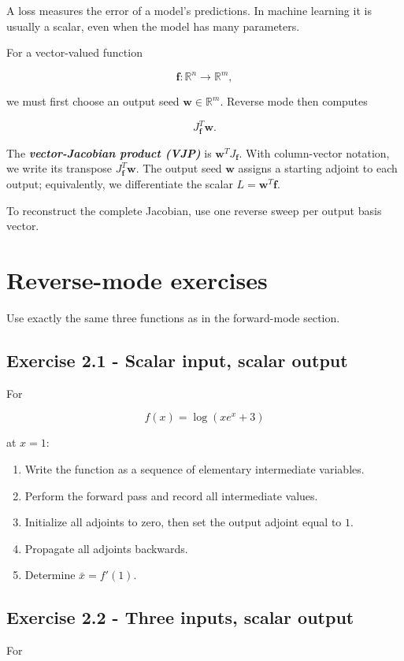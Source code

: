 \documentclass{course_sheet}
\begin{document}
A loss measures the error of a model's predictions. In machine learning it is usually a scalar, even when the model has many parameters.

For a vector-valued function

\[
\mathbf f:\mathbb R^n\to\mathbb R^m,
\]

we must first choose an output seed $\mathbf w\in\mathbb R^m$. Reverse mode then computes

\[
{
J_{\mathbf f}^T\mathbf w
}.
\]

The \textbf{\textit{vector-Jacobian product (VJP)}} is $\mathbf w^TJ_{\mathbf f}$. With column-vector notation, we write its transpose $J_{\mathbf f}^T\mathbf w$. The output seed $\mathbf w$ assigns a starting adjoint to each output; equivalently, we differentiate the scalar $L=\mathbf w^T\mathbf f$.

To reconstruct the complete Jacobian, use one reverse sweep per output basis vector.

\section*{Reverse-mode exercises}
Use exactly the same three functions as in the forward-mode section.

\subsection*{Exercise 2.1 - Scalar input, scalar output}
For

\[
f(x)=\log(xe^x+3)
\]

at $x=1$:

\begin{enumerate}
\item
Write the function as a sequence of elementary intermediate variables.

\item
Perform the forward pass and record all intermediate values.

\item
Initialize all adjoints to zero, then set the output adjoint equal to $1$.

\item
Propagate all adjoints backwards.

\item
Determine $\bar x=f'(1)$.

\end{enumerate}
\subsection*{Exercise 2.2 - Three inputs, scalar output}
For
\end{document}
